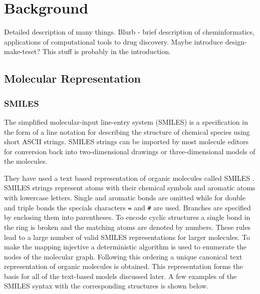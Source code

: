 \chapter{Background} \label{ch:background}

Detailed description of many things. Blurb - brief description of cheminformatics, applications of computational tools to drug discovery. Maybe introduce design-make-teset? This stuff is probably in the introduction.

\section{Molecular Representation}

\subsection{SMILES}
The simplified molecular-input line-entry system (SMILES) is a specification in the form of a line notation for describing the structure of chemical species using short ASCII strings. SMILES strings can be imported by most molecule editors for conversion back into two-dimensional drawings or three-dimensional models of the molecules.

They have used a text based representation of organic molecules called SMILES \cite{Weininger1988, Weininger1989}. SMILES strings represent atoms with their chemical symbols and aromatic atoms with lowercase letters. Single and aromatic bonds are omitted while for double and triple bonds the specials characters \texttt{=} and \texttt{\#} are used. Branches are specified by enclosing them into parentheses. To encode cyclic structures a single bond in the ring is broken and the matching atoms are denoted by numbers. These rules lead to a large number of valid SMILES representations for larger molecules. To make the mapping injective a deterministic algorithm is used to enumerate the nodes of the molecular graph. Following this ordering a unique canonical text representation of organic molecules is obtained. This representation forms the basis for all of the text-based models discussed later. 
A few examples of the SMILES syntax with the corresponding structures is shown below. 

